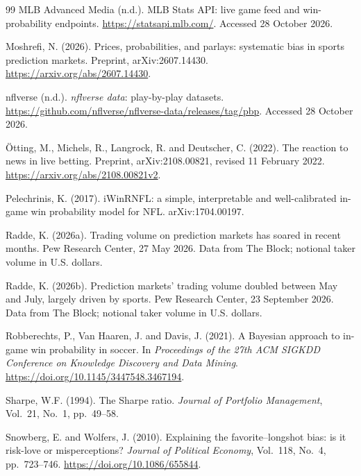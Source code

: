 \documentclass[12pt,a4paper,oneside]{report}
\begin{document}
\begin{thebibliography}{99}
MLB Advanced Media (n.d.). MLB Stats API: live game feed and win-probability
endpoints. \url{https://statsapi.mlb.com/}.
Accessed 28 October 2026.

Moshrefi, N. (2026). Prices, probabilities, and parlays: systematic bias in
sports prediction markets. Preprint, arXiv:2607.14430.
\url{https://arxiv.org/abs/2607.14430}.

nflverse (n.d.). \textit{nflverse data}: play-by-play datasets.
\url{https://github.com/nflverse/nflverse-data/releases/tag/pbp}.
Accessed 28 October 2026.

\"Otting, M., Michels, R., Langrock, R. and Deutscher, C. (2022). The reaction
to news in live betting. Preprint, arXiv:2108.00821, revised 11 February 2022.
\url{https://arxiv.org/abs/2108.00821v2}.

Pelechrinis, K. (2017). iWinRNFL: a simple, interpretable and well-calibrated
in-game win probability model for NFL. arXiv:1704.00197.

Radde, K. (2026a). Trading volume on prediction markets has soared in recent
months. Pew Research Center, 27 May 2026. Data from The Block; notional taker
volume in U.S. dollars.

Radde, K. (2026b). Prediction markets' trading volume doubled between May and
July, largely driven by sports. Pew Research Center, 23 September 2026. Data from
The Block; notional taker volume in U.S. dollars.

Robberechts, P., Van Haaren, J. and Davis, J. (2021). A Bayesian approach to
in-game win probability in soccer. In \textit{Proceedings of the 27th ACM SIGKDD
Conference on Knowledge Discovery and Data Mining}.
\url{https://doi.org/10.1145/3447548.3467194}.

Sharpe, W.F. (1994). The Sharpe ratio. \textit{Journal of Portfolio Management},
Vol.~21, No.~1, pp.~49--58.

Snowberg, E. and Wolfers, J. (2010). Explaining the favorite--longshot bias: is
it risk-love or misperceptions? \textit{Journal of Political Economy},
Vol.~118, No.~4, pp.~723--746.
\url{https://doi.org/10.1086/655844}.


\end{thebibliography}
\end{document}
